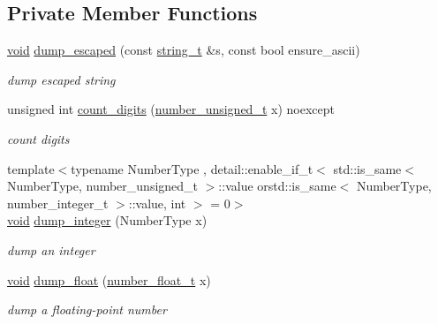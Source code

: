 \subsection*{Private Member Functions}
\begin{DoxyCompactItemize}
\item 
\hyperlink{namespacenlohmann_1_1detail_a59fca69799f6b9e366710cb9043aa77d}{void} \hyperlink{classnlohmann_1_1detail_1_1serializer_ac1f8d1165b44149bd8be397dce68ea05}{dump\+\_\+escaped} (const \hyperlink{classnlohmann_1_1detail_1_1serializer_ad08aa54fac1dd0a453320c54137d45ba}{string\+\_\+t} \&s, const bool ensure\+\_\+ascii)
\begin{DoxyCompactList}\small\item\em dump escaped string \end{DoxyCompactList}\item 
unsigned int \hyperlink{classnlohmann_1_1detail_1_1serializer_a10692e98ea1f5a64de1d0b8e0e724b99}{count\+\_\+digits} (\hyperlink{classnlohmann_1_1detail_1_1serializer_a16c7b7a726a38ff0c06dce7ba7968391}{number\+\_\+unsigned\+\_\+t} x) noexcept
\begin{DoxyCompactList}\small\item\em count digits \end{DoxyCompactList}\item 
{\footnotesize template$<$typename Number\+Type , detail\+::enable\+\_\+if\+\_\+t$<$ std\+::is\+\_\+same$<$ Number\+Type, number\+\_\+unsigned\+\_\+t $>$\+::value orstd\+::is\+\_\+same$<$ Number\+Type, number\+\_\+integer\+\_\+t $>$\+::value, int $>$  = 0$>$ }\\\hyperlink{namespacenlohmann_1_1detail_a59fca69799f6b9e366710cb9043aa77d}{void} \hyperlink{classnlohmann_1_1detail_1_1serializer_a944f6dea8dbe2961da145d2f62fa2c2f}{dump\+\_\+integer} (Number\+Type x)
\begin{DoxyCompactList}\small\item\em dump an integer \end{DoxyCompactList}\item 
\hyperlink{namespacenlohmann_1_1detail_a59fca69799f6b9e366710cb9043aa77d}{void} \hyperlink{classnlohmann_1_1detail_1_1serializer_a6d652a3bfa581cf1cd7790d6d11ea52f}{dump\+\_\+float} (\hyperlink{classnlohmann_1_1detail_1_1serializer_a460c6794fbabbb2ae83380e987a6c030}{number\+\_\+float\+\_\+t} x)
\begin{DoxyCompactList}\small\item\em dump a floating-\/point number \end{DoxyCompactList}\item 

\end{DoxyCompactItemize}
